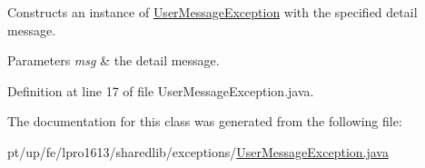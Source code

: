 Constructs an instance of {\ttfamily \hyperlink{classpt_1_1up_1_1fe_1_1lpro1613_1_1sharedlib_1_1exceptions_1_1_user_message_exception}{User\+Message\+Exception}} with the specified detail message.


\begin{DoxyParams}{Parameters}
{\em msg} & the detail message. \\
\hline
\end{DoxyParams}


Definition at line 17 of file User\+Message\+Exception.\+java.



The documentation for this class was generated from the following file\+:\begin{DoxyCompactItemize}
\item 
pt/up/fe/lpro1613/sharedlib/exceptions/\hyperlink{_user_message_exception_8java}{User\+Message\+Exception.\+java}\end{DoxyCompactItemize}
